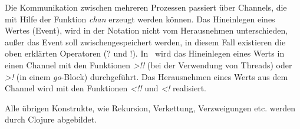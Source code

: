 Die Kommunikation zwischen mehreren Prozessen passiert über Channels, die mit Hilfe der Funktion \textit{chan} erzeugt werden können. Das Hineinlegen eines Wertes (Event), wird in der Notation nicht vom Herausnehmen unterschieden, außer das Event soll zwischengespeichert werden, in diesem Fall existieren die oben erklärten Operatoren (? und !). In \CA\ wird das Hineinlegen eines Werts in einen Channel mit den Funktionen \textit{>!!} (bei der Verwendung von Threads) oder \textit{>!} (in einem \textit{go}-Block) durchgeführt. Das Herausnehmen eines Werts aus dem Channel wird mit den Funktionen \textit{<!!} und \textit{<!} realisiert.

Alle übrigen Konstrukte, wie Rekursion, Verkettung, Verzweigungen etc. werden durch Clojure abgebildet.

